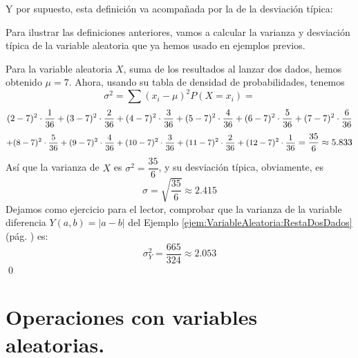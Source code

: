 Y por supuesto, esta definición va acompañada por la de la desviación típica:
    \begin{center}
    \end{center}
Para ilustrar las definiciones anteriores, vamos a calcular la varianza y desviación típica de la variable aleatoria que ya hemos usado en ejemplos previos.
\begin{Ejemplo}
\label{cap04:ejem:varianzaVariableAleatoriaDiscreta}
Para la variable aleatoria $X$, suma de los resultados al lanzar dos dados, hemos obtenido $\mu=7$. Ahora, usando su tabla de densidad de probabilidades, tenemos
    \[\sigma^2=\sum (x_i-\mu)^2 P(X=x_i)=\]
    \[\mbox{\small $
    (2-7)^2\cdot\dfrac{1}{36}+(3-7)^2\cdot\dfrac{2}{36}+(4-7)^2\cdot\dfrac{3}{36}+(5-7)^2\cdot\dfrac{4}{36}+(6-7)^2\cdot\dfrac{5}{36}+(7-7)^2\cdot\dfrac{6}{36}$}\]
    \[\mbox{\small $
    +(8-7)^2\cdot\dfrac{5}{36}+(9-7)^2\cdot\dfrac{4}{36}+(10-7)^2\cdot\dfrac{3}{36}+(11-7)^2\cdot\dfrac{2}{36}
    +(12-7)^2\cdot\dfrac{1}{36}$}=\dfrac{35}{6}\approx 5.833\]
Así que la varianza de $X$ es $\sigma^2=\dfrac{35}{6}$, y su desviación típica, obviamente, es \[\sigma=\sqrt{\dfrac{35}{6}}\approx 2.415\]
Dejamos como ejercicio para el lector, comprobar que la varianza de la variable diferencia $Y(a,b)=|a-b|$ del Ejemplo \ref{ejem:VariableAleatoria:RestaDosDados} (pág. \pageref{ejem:VariableAleatoria:RestaDosDados}) es:
\[\sigma^2_Y=\dfrac{665}{324}\approx 2.053\]
\qed
\end{Ejemplo}

\section{Operaciones con variables aleatorias.}
\label{sec:OperacionesVariablesAleatorias}

